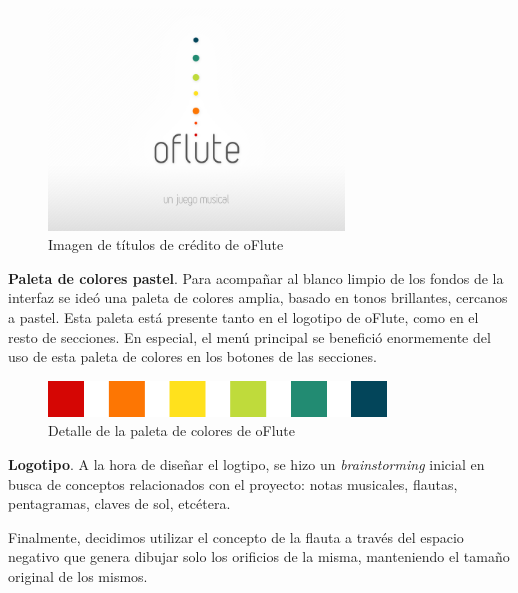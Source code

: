\begin{figure}[htp!]
  \centering
  \includegraphics[width=0.7\textwidth]{apendice_manual_usuario/imagen_estadoIntro}
  \caption{Imagen de títulos de crédito de oFlute}
\end{figure}

\textbf{Paleta de colores pastel}. Para acompañar al blanco limpio de los
fondos de la interfaz se ideó una paleta de colores amplia, basado en tonos
brillantes, cercanos a pastel. Esta paleta está presente tanto en el logotipo de
oFlute, como en el resto de secciones. En especial, el menú principal se
benefició enormemente del uso de esta paleta de colores en los botones de las
secciones.

\begin{figure}[htp!]
  \centering
  \includegraphics[width=0.8\textwidth]{5_diseno/imagen_escala_colores}
  \caption{Detalle de la paleta de colores de oFlute}
\end{figure}

\textbf{Logotipo}. A la hora de diseñar el logtipo, se hizo un
\textit{brainstorming} inicial en busca de conceptos relacionados con el
proyecto: notas musicales, flautas, pentagramas, claves de sol, etcétera.

Finalmente, decidimos utilizar el concepto de la flauta a través del espacio
negativo que genera dibujar solo los orificios de la misma, manteniendo el
tamaño original de los mismos.

